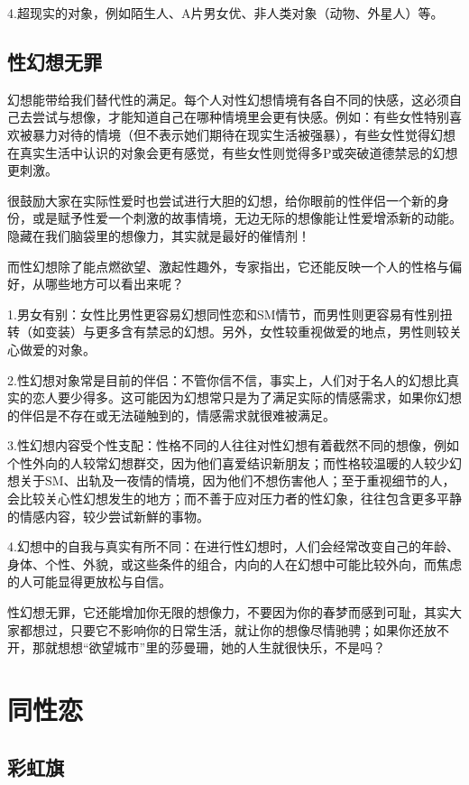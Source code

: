\documentclass[12pt,UTF8]{ctexbook}
\begin{document}
4.超现实的对象，例如陌生人、A片男女优、非人类对象（动物、外星人）等。

\section{性幻想无罪}

幻想能带给我们替代性的满足。每个人对性幻想情境有各自不同的快感，这必须自己去尝试与想像，才能知道自己在哪种情境里会更有快感。例如：有些女性特别喜欢被暴力对待的情境（但不表示她们期待在现实生活被强暴），有些女性觉得幻想在真实生活中认识的对象会更有感觉，有些女性则觉得多P或突破道德禁忌的幻想更刺激。

很鼓励大家在实际性爱时也尝试进行大胆的幻想，给你眼前的性伴侣一个新的身份，或是赋予性爱一个刺激的故事情境，无边无际的想像能让性爱增添新的动能。隐藏在我们脑袋里的想像力，其实就是最好的催情剂！

而性幻想除了能点燃欲望、激起性趣外，专家指出，它还能反映一个人的性格与偏好，从哪些地方可以看出来呢？

1.男女有别：女性比男性更容易幻想同性恋和SM情节，而男性则更容易有性别扭转（如变装）与更多含有禁忌的幻想。另外，女性较重视做爱的地点，男性则较关心做爱的对象。

2.性幻想对象常是目前的伴侣：不管你信不信，事实上，人们对于名人的幻想比真实的恋人要少得多。这可能因为幻想常只是为了满足实际的情感需求，如果你幻想的伴侣是不存在或无法碰触到的，情感需求就很难被满足。

3.性幻想内容受个性支配：性格不同的人往往对性幻想有着截然不同的想像，例如个性外向的人较常幻想群交，因为他们喜爱结识新朋友；而性格较温暖的人较少幻想关于SM、出轨及一夜情的情境，因为他们不想伤害他人；至于重视细节的人，会比较关心性幻想发生的地方；而不善于应对压力者的性幻象，往往包含更多平静的情感内容，较少尝试新鮮的事物。

4.幻想中的自我与真实有所不同：在进行性幻想时，人们会经常改变自己的年龄、身体、个性、外貌，或这些条件的组合，内向的人在幻想中可能比较外向，而焦虑的人可能显得更放松与自信。

性幻想无罪，它还能增加你无限的想像力，不要因为你的春梦而感到可耻，其实大家都想过，只要它不影响你的日常生活，就让你的想像尽情驰骋；如果你还放不开，那就想想“欲望城市”里的莎曼珊，她的人生就很快乐，不是吗？

\chapter{同性恋}

\section{彩虹旗}
\end{document}
